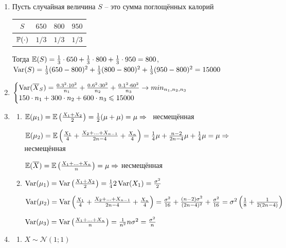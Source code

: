 \documentclass[12pt, a4paper]{article}\usepackage[]{graphicx}\usepackage[]{color}
\newcommand{\cN}{\mathcal{N}}
\begin{document}
\begin{enumerate}
\item Пусть случайная величина $S$ – это сумма поглощённых калорий

\begin{tabular}{cccc}
\toprule
$S$ & $650$ & $800$ & $950$ \\ \midrule
$\P(\cdot)$ & $1/3$ & $1/3$ & $1/3$ \\ \bottomrule
\end{tabular}

Тогда $\E(S) = \frac{1}{3}\cdot 650 +  \frac{1}{3}\cdot 800 +  \frac{1}{3}\cdot 950 = 800$, $\Var(S) = \frac{1}{3}(650-800)^2 + \frac{1}{3}(800-800)^2 + \frac{1}{3}(950-800)^2 = 15000$

\item
$
\begin{cases}
\Var(\overline{X}_S) = \frac{0.3^2\cdot 10^2}{n_1} + \frac{0.6^2 \cdot 30^2}{n_2} + \frac{0.1^2 \cdot 60^2}{n_3} \to min_{n_1, n_2, n_3} \\
150\cdot n_1 + 300 \cdot n_2 + 600 \cdot n_3 \leq 15000
\end{cases}
$

\item
\begin{enumerate}
\item $\E(\mu_1) = \E\left(\frac{X_1+X_2}{2}\right)  = \frac{1}{2}(\mu+\mu) = \mu \Rightarrow$  несмещённая

$\E(\mu_2) = \E \left(\frac{X_1}{4} + \frac{X_2+\ldots+X_{n-1}}{2n-4} + \frac{X_n}{4}\right) = \frac{1}{4}\mu + \frac{n-2}{2n-4}\mu + \frac{1}{4}\mu = \mu \Rightarrow$ несмещённая

$\E(\overline{X}) = \E\left(\frac{X_1 + \ldots + X_n}{n}\right) = \mu \Rightarrow$ несмещённая

\item $\Var(\mu_1) = \Var\left(\frac{X_1+X_2}{2}\right)  = \frac{1}{4}2\Var(X_1) = \frac{\sigma^2}{2}$

$\Var(\mu_2) = \Var \left(\frac{X_1}{4} + \frac{X_2+\ldots+X_{n-1}}{2n-4} + \frac{X_n}{4}\right)  = \frac{\sigma^2}{16} + \frac{(n-2)\sigma^2}{(2n-4)^2} + \frac{\sigma^2}{16} = \sigma^2\left(\frac{1}{8} + \frac{1}{2(2n-4)} \right)$

$\Var(\mu_3) = \Var\left(\frac{X_1 + \ldots + X_n}{n}\right)  = \frac{1}{n^2}n\sigma^2 = \frac{\sigma^2}{n}$
\end{enumerate}

\item
\begin{enumerate}
\item $X \sim \cN (1;1)$


\end{enumerate}
\end{enumerate}
\end{document}
